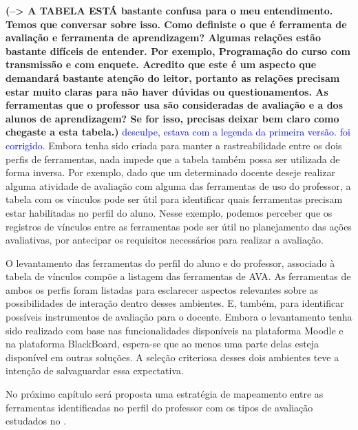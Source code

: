 \textbf{(--> A TABELA ESTÁ bastante confusa para o meu entendimento. Temos que conversar sobre isso. Como definiste o que é ferramenta de avaliação e ferramenta de aprendizagem? Algumas relações estão bastante difíceis de entender. Por exemplo, Programação do curso com transmissão e com enquete. Acredito que este é um aspecto que demandará bastante atenção do leitor, portanto as relações precisam estar muito claras para não haver dúvidas ou questionamentos. As ferramentas que o professor usa são consideradas de avaliação e a dos alunos de aprendizagem? Se for isso, precisas deixar bem claro como chegaste a esta tabela.)}  \textcolor{blue} {desculpe, estava com a legenda da primeira versão. foi corrigido.}
Embora tenha sido criada para manter a rastreabilidade entre os dois perfis de ferramentas, nada impede que a tabela também possa ser utilizada de forma inversa. Por exemplo, dado que um determinado docente deseje realizar alguma atividade de avaliação com alguma das ferramentas de uso do professor, a tabela com os vínculos pode ser útil para identificar quais ferramentas precisam estar habilitadas no perfil do aluno. Nesse exemplo, podemos perceber que os registros de vínculos entre as ferramentas pode ser útil no planejamento das ações avaliativas, por antecipar os requisitos necessários para realizar a avaliação.

O levantamento das ferramentas do perfil do aluno e do professor, associado à tabela de vínculos compõe a listagem das ferramentas de AVA. As ferramentas de ambos os perfis foram listadas para esclarecer aspectos relevantes sobre as possibilidades de interação dentro desses ambientes. E, também, para identificar possíveis instrumentos de avaliação para o docente. Embora o levantamento tenha sido realizado com base nas funcionalidades disponíveis na plataforma Moodle e na plataforma BlackBoard, espera-se que ao menos uma parte delas esteja disponível em outras soluções. A seleção criteriosa desses dois ambientes teve a intenção de salvaguardar essa expectativa.

No próximo capítulo será proposta uma estratégia de mapeamento entre as ferramentas identificadas no perfil do professor com os tipos de avaliação estudados no .


